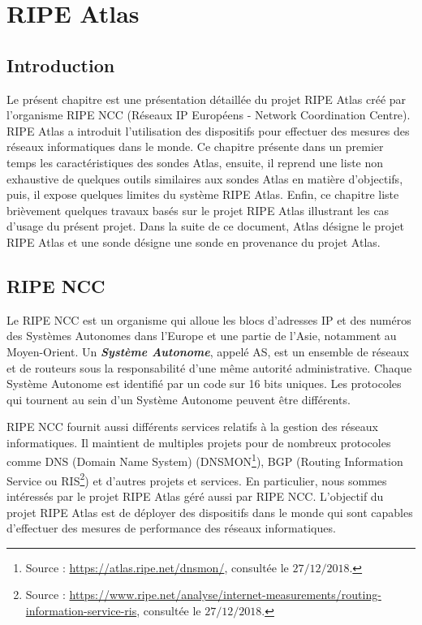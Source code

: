 
\chapter{RIPE Atlas}

\section{Introduction}
Le présent chapitre est une présentation détaillée du projet RIPE Atlas créé par l'organisme RIPE NCC (Réseaux IP Européens - Network Coordination Centre).  RIPE Atlas  a introduit l'utilisation des dispositifs pour  effectuer des mesures des réseaux informatiques dans le monde. Ce chapitre présente dans un premier temps les caractéristiques des sondes Atlas, ensuite, il  reprend une liste non exhaustive  de quelques outils similaires aux sondes Atlas en matière d'objectifs, puis, il expose quelques limites du système RIPE Atlas. Enfin, ce chapitre  liste  brièvement quelques travaux basés sur le projet RIPE Atlas illustrant les cas d'usage du présent projet. Dans la suite de ce document,    Atlas désigne le projet RIPE Atlas et une sonde désigne une sonde en provenance  du projet Atlas.

\section{RIPE NCC}
Le RIPE NCC  est un organisme qui alloue les blocs d'adresses IP et des numéros des Systèmes Autonomes dans l'Europe et une partie de l'Asie, notamment au Moyen-Orient. Un\textit{ \textbf{Système Autonome}}, appelé AS, est un ensemble de réseaux et de routeurs sous la responsabilité d'une même autorité administrative. Chaque Système Autonome est identifié par un code sur 16 bits uniques. Les protocoles qui tournent au sein d'un Système Autonome peuvent être différents.


RIPE NCC fournit  aussi différents services relatifs à la gestion des réseaux informatiques. Il maintient de multiples projets  pour de nombreux  protocoles comme DNS (Domain Name System)  (DNSMON\footnote{Source : \url{https://atlas.ripe.net/dnsmon/}, consultée le $27/12/2018$.}), BGP (Routing Information Service ou RIS\footnote{Source : \url{https://www.ripe.net/analyse/internet-measurements/routing-information-service-ris}, consultée le $27/12/2018$.}) et d'autres projets et services. En particulier, nous sommes intéressés  par le projet RIPE Atlas géré aussi par RIPE NCC. L'objectif du projet RIPE Atlas est de déployer des dispositifs dans le monde qui sont capables d'effectuer des mesures de performance des réseaux informatiques.

